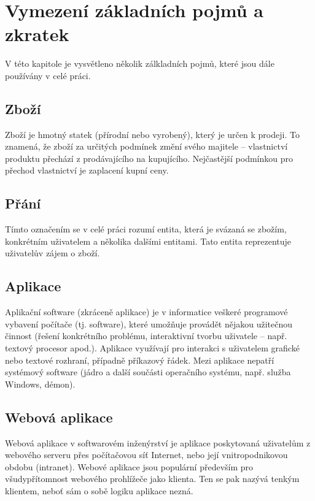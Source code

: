 \chapter{Vymezení základních pojmů a zkratek}
V této kapitole je vysvětleno několik zálkladních pojmů, které jsou dále používány v celé práci.
\section{Zboží}
Zboží je hmotný statek (přírodní nebo vyrobený), který je určen k prodeji. To znamená, že zboží za určitých podmínek změní svého majitele – vlastnictví produktu přechází z prodávajícího na kupujícího. Nejčastější podmínkou pro přechod vlastnictví je zaplacení kupní ceny.
\section{Přání}
Tímto označením se v celé práci rozumí entita, která je svázaná se zbožím, konkrétním uživatelem a několika dalšími entitami. Tato entita reprezentuje uživatelův zájem o zboží.

\section{Aplikace}
Aplikační software (zkráceně aplikace) je v informatice veškeré programové vybavení počítače (tj. software), které umožňuje provádět nějakou užitečnou činnost (řešení konkrétního problému, interaktivní tvorbu uživatele – např. textový procesor apod.). Aplikace využívají pro interakci s uživatelem grafické nebo textové rozhraní, případně příkazový řádek. Mezi aplikace nepatří systémový software (jádro a další součásti operačního systému, např. služba Windows, démon).

\section{Webová aplikace}
Webová aplikace v softwarovém inženýrství je aplikace poskytovaná uživatelům z webového serveru přes počítačovou síť Internet, nebo její vnitropodnikovou obdobu (intranet). Webové aplikace jsou populární především pro všudypřítomnost webového prohlížeče jako klienta. Ten se pak nazývá tenkým klientem, neboť sám o sobě logiku aplikace nezná.
